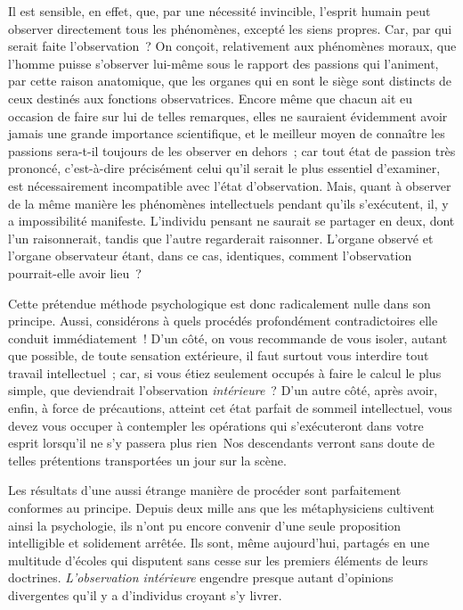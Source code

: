 \documentclass[french,twoside]{book} %
\begin{document}
Il est sensible, en effet, que, par une nécessité invincible, l’esprit humain peut observer directement tous les phénomènes, excepté les siens propres. Car, par qui serait faite l’observation ? On conçoit, relativement aux phénomènes moraux, que l’homme puisse s’observer lui-même sous le rapport des passions qui l’animent, par cette raison anatomique, que les organes qui en sont le siège sont distincts de ceux destinés aux fonctions observatrices. Encore même que chacun ait eu occasion de faire sur lui de telles remarques, elles ne sauraient évidemment avoir jamais une grande importance scientifique, et le meilleur moyen de connaître les passions sera-t-il toujours de les observer en dehors ; car tout état de passion très prononcé, c’est-à-dire précisément celui qu’il serait le plus essentiel d’examiner, est nécessairement incompatible avec l’état d’observation. Mais, quant à observer de la même manière les phénomènes intellectuels pendant qu’ils s’exécutent, il, y a impossibilité manifeste. L’individu pensant ne saurait se partager en deux, dont l’un raisonnerait, tandis que l’autre regarderait raisonner. L’organe observé et l’organe observateur étant, dans ce cas, identiques, comment l’observation pourrait-elle avoir lieu ?\par
Cette prétendue méthode psychologique est donc radicalement nulle dans son principe. Aussi, considérons à quels procédés profondément contradictoires elle conduit immédiatement ! D’un côté, on vous recommande de vous isoler, autant que possible, de toute sensation extérieure, il faut surtout vous interdire tout travail intellectuel ; car, si vous étiez seulement occupés à faire le calcul le plus simple, que deviendrait l’observation {\itshape intérieure} ? D’un autre côté, après avoir, enfin, à force de précautions, atteint cet état parfait de sommeil intellectuel, vous devez vous occuper à contempler les opérations qui s’exécuteront dans votre esprit lorsqu’il ne s’y passera plus rien Nos descendants verront sans doute de telles prétentions transportées un jour sur la scène.\par
Les résultats d’une aussi étrange manière de procéder sont parfaitement conformes au principe. Depuis deux mille ans que les métaphysiciens cultivent ainsi la psychologie, ils n’ont pu encore convenir d’une seule proposition intelligible et solidement arrêtée. Ils sont, même aujourd’hui, partagés en une multitude d’écoles qui disputent sans cesse sur les premiers éléments de leurs doctrines. {\itshape L’observation intérieure} engendre presque autant d’opinions divergentes qu’il y a d’individus croyant s’y livrer.\par
\end{document}
